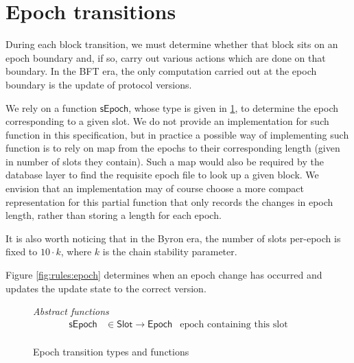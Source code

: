 \documentclass[11pt,a4paper]{article}
\newcommand{\fun}[1]{\mathsf{#1}}
\newcommand{\type}[1]{\mathsf{#1}}
\newcommand{\totalf}{\to}
\newcommand{\Slot}{\type{Slot}}
\begin{document}
\clearpage

\section{Epoch transitions}

\newcommand{\Epoch}{\type{Epoch}}

\newcommand{\ETState}{\type{ETState}}
\newcommand{\ETEnv}{\type{ETEnv}}

\newcommand{\sepochname}{sEpoch}
\newcommand{\sepoch}[1]{\fun{\sepochname}\ #1}

During each block transition, we must determine whether that block sits on an
epoch boundary and, if so, carry out various actions which are done on that
boundary. In the BFT era, the only computation carried out at the epoch boundary
is the update of protocol versions.

We rely on a function $\fun{\sepochname}$, whose type is given in
\cref{fig:defs:epoch}, to determine the epoch corresponding to a given slot.
%
We do not provide an implementation for such function in this specification,
but in practice a possible way of implementing such function is to rely on map
from the epochs to their corresponding length (given in number of slots they
contain). Such a map would also be required by the database layer to find the
requisite epoch file to look up a given block. We envision that an
implementation may of course choose a more compact representation for this
partial function that only records the changes in epoch length, rather than
storing a length for each epoch.

It is also worth noticing that in the Byron era, the number of slots per-epoch
is fixed to $10 \cdot k$, where $k$ is the chain stability parameter.

Figure \ref{fig:rules:epoch} determines when an epoch change has occurred and
updates the update state to the correct version.

\begin{figure}[ht]
  \emph{Abstract functions}
  \begin{equation*}
    \begin{array}{rlr}
      \fun{\sepochname}
      & \in \Slot \totalf \Epoch
      & \text{epoch containing this slot} \\
    \end{array}
  \end{equation*}

  \caption{Epoch transition types and functions}
  \label{fig:defs:epoch}
\end{figure}
\end{document}
